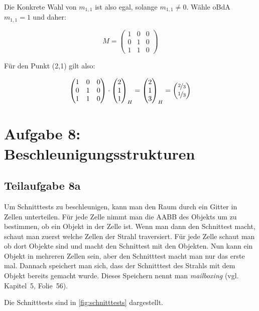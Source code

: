 \documentclass[a4paper]{scrartcl}
\begin{document}
Die Konkrete Wahl von $m_{1,1}$ ist also egal, solange $m_{1,1} \neq 0$. Wähle
oBdA $m_{1,1} = 1$ und daher:

\[M = \begin{pmatrix}      1 & 0 & 0\\
                           0 & 1 & 0\\
                           1 & 1 & 0\end{pmatrix}\]

Für den Punkt (2,1) gilt also:

\[\begin{pmatrix}1 & 0 & 0\\
                 0 & 1 & 0\\
                 1 & 1 & 0\end{pmatrix} \cdot \begin{pmatrix}2\\1\\1\end{pmatrix}_H = \begin{pmatrix}2\\1\\3\end{pmatrix}_H = \begin{pmatrix}\nicefrac{2}{3}\\\nicefrac{1}{3}\end{pmatrix}\]


\section*{Aufgabe 8: Beschleunigungsstrukturen}
\subsection*{Teilaufgabe 8a}
Um Schnitttests zu beschleunigen, kann man den Raum durch ein Gitter in Zellen
unterteilen. Für jede Zelle nimmt man die AABB des Objekts um zu bestimmen,
ob ein Objekt in der Zelle ist. Wenn man dann den Schnittest macht, schaut man
zuerst welche Zellen der Strahl traversiert. Für jede Zelle schaut man ob dort
Objekte sind und macht den Schnittest mit den Objekten. Nun kann ein Objekt in
mehreren Zellen sein, aber den Schnitttest macht man nur das erste mal. Dannach
speichert man sich, dass der Schnitttest des Strahls mit dem Objekt bereits
gemacht wurde. Dieses Speichern nennt man \textit{mailboxing} (vgl. Kapitel~5, Folie~56).

Die Schnitttests sind in \cref{fig:schnitttests} dargestellt.
\end{document}
